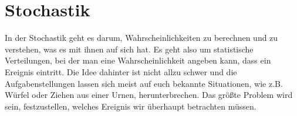 \chapter{Stochastik}
	In der Stochastik geht es darum, Wahrscheinlichkeiten zu berechnen und zu
	verstehen, was es mit ihnen auf sich hat. Es geht also um statistische
	Verteilungen, bei der man eine Wahrscheinlichkeit angeben kann, dass ein
	Ereignis eintritt. Die Idee dahinter ist nicht allzu schwer und die
	Aufgabenstellungen lassen sich meist auf euch bekannte Situationen, wie z.B.
	Würfel oder Ziehen aus einer Urnen, herunterbrechen. Das größte Problem wird
	sein, festzustellen, welches Ereignis wir überhaupt betrachten müssen.

	

	

	

	

	

	

	